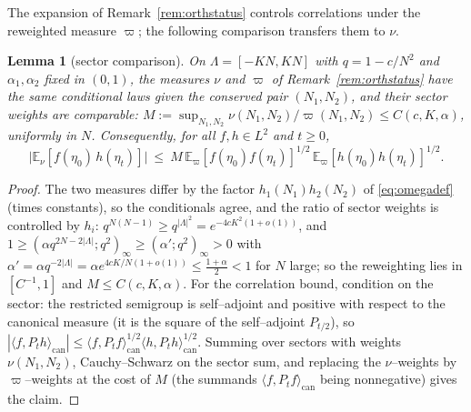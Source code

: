 \documentclass[11pt]{article}
\theoremstyle{plain}
\newtheorem{lemma}[theorem]{Lemma}
\theoremstyle{definition}
\theoremstyle{remark}
\newcommand{\E}{\mathbb{E}}\newcommand{\PP}{\mathbb{P}}\newcommand{\dd}{\,\mathrm{d}}
\begin{document}
The expansion of Remark~\ref{rem:orthstatus} controls correlations under the
reweighted measure $\varpi$; the following comparison transfers them to $\nu$.

\begin{lemma}[sector comparison]\label{lem:sector}
On $\Lambda=[-KN,KN]$ with $q=1-c/N^2$ and $\alpha_1,\alpha_2$ fixed in $(0,1)$, the
measures $\nu$ and $\varpi$ of Remark~\ref{rem:orthstatus} have the same conditional
laws given the conserved pair $(N_1,N_2)$, and their sector weights are comparable:
$M:=\sup_{N_1,N_2}\nu(N_1,N_2)/\varpi(N_1,N_2)\le C(c,K,\alpha)$, uniformly in $N$.
Consequently, for all $f,h\in L^2$ and $t\ge0$,
\[
  \big|\E_\nu[f(\eta_0)\,h(\eta_t)]\big|\ \le\ M\,
  \E_\varpi[f(\eta_0)f(\eta_t)]^{1/2}\,\E_\varpi[h(\eta_0)h(\eta_t)]^{1/2}.
\]
\end{lemma}
\begin{proof}
The two measures differ by the factor $h_1(N_1)h_2(N_2)$ of \eqref{eq:omegadef}
(times constants), so the conditionals agree, and the ratio of sector weights is
controlled by $h_i$: $q^{N(N-1)}\ge q^{|\Lambda|^2}=e^{-4cK^2(1+o(1))}$, and
$1\ge(\alpha q^{2N-2|\Lambda|};q^2)_\infty\ge(\alpha';q^2)_\infty>0$ with
$\alpha'=\alpha q^{-2|\Lambda|}=\alpha e^{4cK/N(1+o(1))}\le\tfrac{1+\alpha}2<1$ for
$N$ large; so the reweighting lies in $[C^{-1},1]$ and $M\le C(c,K,\alpha)$. For the
correlation bound, condition on the sector: the restricted semigroup is
self--adjoint and positive with respect to the canonical measure (it is the square
of the self--adjoint $P_{t/2}$), so
$|\langle f,P_th\rangle_{\mathrm{can}}|\le
\langle f,P_tf\rangle_{\mathrm{can}}^{1/2}\langle h,P_th\rangle_{\mathrm{can}}^{1/2}$.
Summing over sectors with weights $\nu(N_1,N_2)$, Cauchy--Schwarz on the sector sum,
and replacing the $\nu$--weights by $\varpi$--weights at the cost of $M$ (the
summands $\langle f,P_tf\rangle_{\mathrm{can}}$ being nonnegative) gives the claim.
\end{proof}
\end{document}
